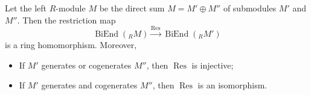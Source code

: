 Let the left $R$-module $M$ be the direct sum $M = M' \oplus M''$ of submodules $M'$ and $M''$. Then the restriction map
$$\operatorname{BiEnd}({}_R M) \xrightarrow{\operatorname{Res}} \operatorname{BiEnd}({}_R M')$$
is a ring homomorphism. Moreover,
\begin{itemize}
\item[(1)] If $M'$ generates or cogenerates $M''$, then $\operatorname{Res}$ is injective;
\item[(2)] If $M'$ generates and cogenerates $M''$, then $\operatorname{Res}$ is an isomorphism.
\end{itemize}
